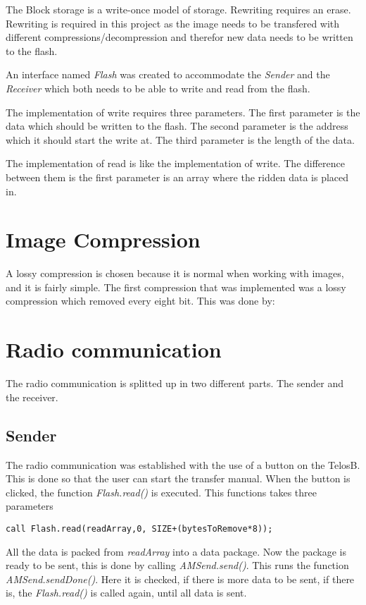 The Block storage is a write-once model of storage. Rewriting requires an erase. Rewriting is required in this project as the image needs to be transfered with different compressions/decompression and therefor new data needs to be written to the flash.

An interface named \emph{Flash} was created to accommodate the \emph{Sender} and the \emph{Receiver} which both needs to be able to write and read from the flash. 

The implementation of write requires three parameters. The first parameter is the data which should be written to the flash. The second parameter is the address which it should start the write at. The third parameter is the length of the data. 

The implementation of read is like the implementation of write. The difference between them is the first parameter is an array where the ridden data is placed in. 

\section{Image Compression}
A lossy compression is chosen because it is normal when working with images, and it is fairly simple. The first compression that was implemented was a lossy compression which removed every eight bit. This was done by:

\section{Radio communication}
The radio communication is splitted up in two different parts. The sender and the receiver.

\subsection{Sender}
The radio communication was established with the use of a button on the TelosB. This is done so that the 
user can start the transfer manual. When the button is clicked, the function \emph{Flash.read()} is executed. This functions takes three parameters

\begin{lstlisting}[caption={The function Flash.read}, label=lst:fread]
call Flash.read(readArray,0, SIZE+(bytesToRemove*8));
\end{lstlisting}

All the data is packed from \emph{readArray} into a data package. Now the package is ready to be sent, this is done by calling \emph{AMSend.send()}. This runs the function \emph{AMSend.sendDone()}. Here it is checked, if there is more data to be sent, if there is, the \emph{Flash.read()} is called again, until all data is sent. 

